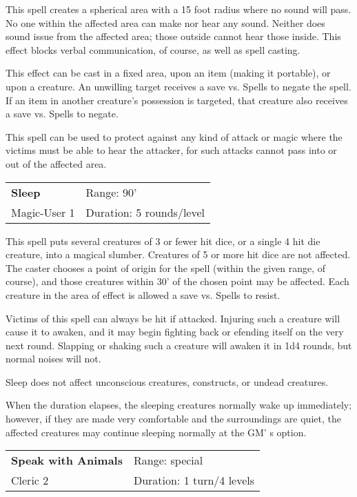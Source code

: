 \documentclass[a4paper,twoside,openany,10pt]{book}
\begin{document}
\begin{multicols}{2}
This spell creates a spherical area with a 15 foot radius where no sound will pass. No one within the affected area can make nor hear any sound. Neither does sound issue from the affected area; those outside cannot hear those inside. This effect blocks verbal communication, of course, as well as spell casting.

This effect can be cast in a fixed area, upon an item (making it portable), or upon a creature. An unwilling target receives a save vs. Spells to negate the spell. If an item in another creature's possession is targeted, that creature also receives a save vs. Spells to negate.

This spell can be used to protect against any kind of attack or magic where the victims must be able to hear the attacker, for such attacks cannot pass into or out of the affected area.

\smallskip\begin{flushleft} 
	\begin{tabularx}{0.45\textwidth}{@{}m{3.5cm}m{5.5cm}@{}} 
		\textbf{Sleep} & Range: 90'\\
		Magic-User 1 & Duration: 5 rounds/level\\
	\end{tabularx}\end{flushleft}

This spell puts several creatures of 3 or fewer hit dice, or a single 4 hit die creature, into a magical slumber. Creatures of 5 or more hit dice are not affected. The caster chooses a point of origin for the spell (within the given range, of course), and those creatures within 30' of the chosen point may be affected. Each creature in the area of effect is allowed a save vs. Spells to resist.

Victims of this spell can always be hit if attacked. Injuring such a creature will cause it to awaken, and it may begin fighting back or efending itself on the very next round. Slapping or shaking such a creature will awaken it in 1d4 rounds, but normal noises will not.

Sleep does not affect unconscious creatures, constructs, or undead creatures.

When the duration elapses, the sleeping creatures normally wake up immediately; however, if they are made very comfortable and the surroundings are quiet, the affected creatures may continue sleeping normally at the GM' s option.

\smallskip\begin{flushleft} 
	\begin{tabularx}{0.45\textwidth}{@{}m{3.5cm}m{5.5cm}@{}} 
		\textbf{Speak with Animals} & Range: special\\
		Cleric 2 & Duration: 1 turn/4 levels\\
	\end{tabularx}\end{flushleft}


\end{multicols}
\end{document}
